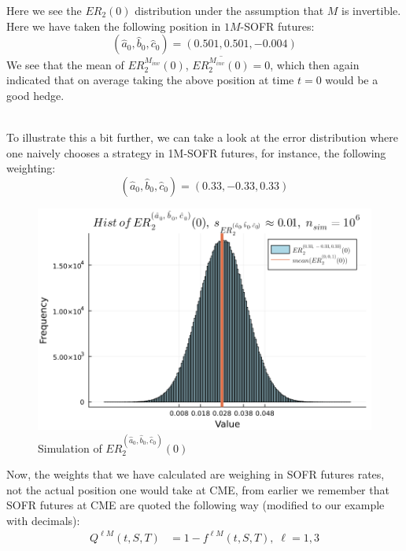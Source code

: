 Here we see the $ER_{2}(0)$ distribution under the assumption that $M$ is invertible. Here we have taken the following position in $1M$-SOFR futures: 
\[
(\hat{a}_{0}, \hat{b}_{0}, \hat{c}_{0})
= 
(0.501, 0.501, -0.004)
\]
We see that the mean of $ER_{2}^{M_{inv}}(0)$, $\overline{ER_{2}^{M_{inv}}(0)} = 0$, which then again indicated that on average taking the above position at time $t=0$ would be a good hedge. 
\\~\\

To illustrate this a bit further, we can take a look at the error distribution where one naively chooses a strategy in 1M-SOFR futures, for instance, the following weighting: 
\[
(\hat{a}_{0}, \hat{b}_{0}, \hat{c}_{0})
= 
(0.33, -0.33, 0.33)
\]

\begin{figure}[htp]
    \centering
    \includegraphics[width=12cm]{figures/SOFR/ER_2(0)_random.PNG}
    \caption{Simulation of $ER_{2}^{(\hat{a}_{0}, \hat{b}_{0}, \hat{c}_{0})}(0)$}
    \label{fig: ER_2_(0)_random}
\end{figure}

Now, the weights that we have calculated are weighing in SOFR futures rates, not the actual position one would take at CME, from earlier we remember that SOFR futures at CME are quoted the following way (modified to our example with decimals): 
\begin{align*}
Q^{\ell M}(t,S,T) &= 1- f^{\ell M}(t,S,T),\; \ell = 1, 3 
\end{align*}

